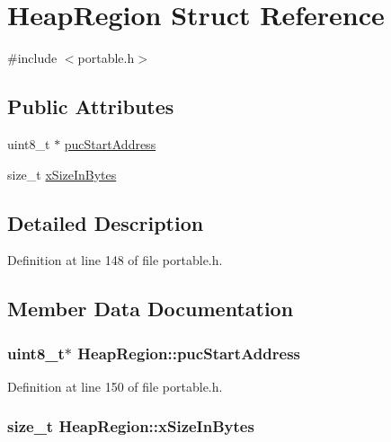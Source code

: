 \hypertarget{struct_heap_region}{}\section{Heap\+Region Struct Reference}
\label{struct_heap_region}


{\ttfamily \#include $<$portable.\+h$>$}

\subsection*{Public Attributes}
\begin{DoxyCompactItemize}
\item 
uint8\+\_\+t $\ast$ \hyperlink{struct_heap_region_aab323508c34642ebfb884a68441d97fc}{puc\+Start\+Address}
\item 
size\+\_\+t \hyperlink{struct_heap_region_a5933b0fd422e70a92ceef839b89a757f}{x\+Size\+In\+Bytes}
\end{DoxyCompactItemize}


\subsection{Detailed Description}


Definition at line 148 of file portable.\+h.



\subsection{Member Data Documentation}
\subsubsection[{\texorpdfstring{puc\+Start\+Address}{pucStartAddress}}]{\setlength{\rightskip}{0pt plus 5cm}uint8\+\_\+t$\ast$ Heap\+Region\+::puc\+Start\+Address}\hypertarget{struct_heap_region_aab323508c34642ebfb884a68441d97fc}{}\label{struct_heap_region_aab323508c34642ebfb884a68441d97fc}


Definition at line 150 of file portable.\+h.

\subsubsection[{\texorpdfstring{x\+Size\+In\+Bytes}{xSizeInBytes}}]{\setlength{\rightskip}{0pt plus 5cm}size\+\_\+t Heap\+Region\+::x\+Size\+In\+Bytes}\hypertarget{struct_heap_region_a5933b0fd422e70a92ceef839b89a757f}{}\label{struct_heap_region_a5933b0fd422e70a92ceef839b89a757f}


